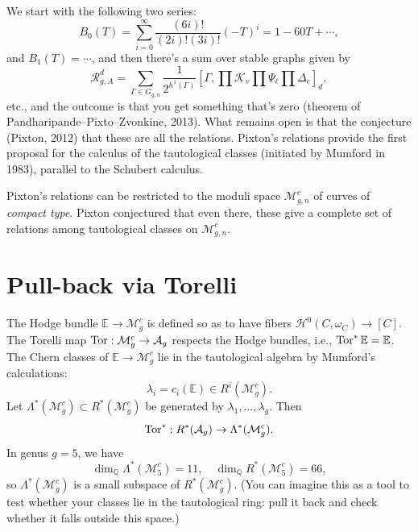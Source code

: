 \documentclass[reqno]{amsart} 
\begin{document}
We start with the following two series:
\begin{equation*}
  B_0(T) = \sum_{i = 0}^\infty \frac{(6 i)!}{(2 i)!(3 i)!}
  (- T)^{i} = 1 - 60 T + \dotsb,
\end{equation*}
and $B_1(T) = \dotsb$, and then there's a sum over stable graphs given by
\begin{equation*}
  \mathcal{R}_{g, A}^{d}
  = \sum_{\Gamma \in G_{g, n}}
  \frac{1}{2^{h^1(\Gamma)}}
  \left[ \Gamma, \prod \mathcal{K}_v \prod \Psi_{\ell} \prod \Delta_e \right]_d,
\end{equation*}
etc., and the outcome is that you get something that's zero (theorem of Pandharipande--Pixto--Zvonkine, 2013).  What remains open is that the conjecture (Pixton, 2012) that these are all the relations.  Pixton's relations provide the first proposal for the calculus of the tautological classes (initiated by Mumford in 1983), parallel to the Schubert calculus.

Pixton's relations can be restricted to the moduli space $\mathcal{M}_{g, n}^{c}$ of curves of \emph{compact type}.  Pixton conjectured that even there, these give a complete set of relations among tautological classes on $\mathcal{M}_{g, n}^{c}$.

\section{Pull-back via Torelli}
The Hodge bundle $\mathbb{E} \rightarrow \mathcal{M}_g^{c}$ is defined so as to have fibers $\mathcal{H}^0(C, \omega_C) \rightarrow[C]$.  The Torelli map $\operatorname{Tor} : \mathcal{M}_g^{c} \rightarrow \mathcal{A}_g$ respects the Hodge bundles, i.e., $\operatorname{Tor}^\ast \mathbb{E} = \mathbb{E}$.  The Chern classes of $\mathbb{E} \rightarrow \mathcal{M}_g^{c}$ lie in the tautological algebra by Mumford's calculations:
\begin{equation*}
  \lambda_i = c_i(\mathbb{E}) \in R^i(\mathcal{M}_g^{c}).
\end{equation*}
Let $\Lambda^\ast(\mathcal{M}_g^{c}) \subset R^\ast(\mathcal{M}_g^{c})$ be generated by $\lambda_1, \dotsc, \lambda_g$.  Then
\begin{equation*}
  \operatorname{Tor}^\ast : R^\ast(\mathcal{A}_g) \rightarrow \Lambda^\ast(\mathcal{M}_g^{c}).
\end{equation*}
In genus $g = 5$, we have
\begin{equation*}
  \dim_{\mathbb{Q}} \Lambda^\ast(\mathcal{M}_5^{c}) = 11, \quad
  \dim_{\mathbb{Q}} R^\ast(\mathcal{M}_5^c) = 66,
\end{equation*}
so $\Lambda^\ast(\mathcal{M}_g^c)$ is a small subspace of $R^\ast(\mathcal{M}_g^{c})$.  (You can imagine this as a tool to test whether your classes lie in the tautological ring: pull it back and check whether it falls outside this space.)
\end{document}
